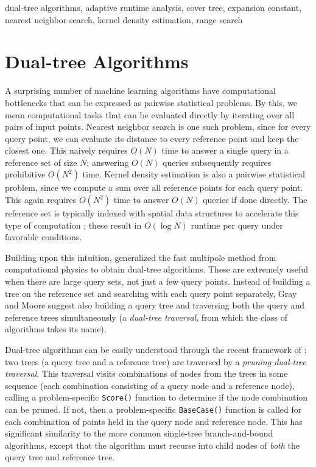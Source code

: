 \documentclass[twoside,11pt]{article} %
\begin{document}
\begin{keywords}
dual-tree algorithms, adaptive runtime analysis, cover tree, expansion constant,
nearest neighbor search, kernel density estimation, range search
\end{keywords}

\section{Dual-tree Algorithms}

A surprising number of machine learning algorithms have computational
bottlenecks that can be expressed as pairwise statistical problems.
By this, we mean computational tasks that can be evaluated directly by iterating over all
pairs of input points.
Nearest neighbor search is one such problem, since for every query point, we can
evaluate its distance to every reference point and keep the closest one.
This naively requires $O(N)$ time
to answer a single query in a reference set of size $N$; answering $O(N)$
queries subsequently requires prohibitive $O(N^2)$ time. Kernel density
estimation is also a pairwise statistical problem, since we compute a sum over all
reference points for each query point.
This again requires $O(N^2)$
time to answer $O(N)$ queries if done directly.
The reference set is typically indexed with
spatial data structures to accelerate this type of computation
\citep{finkel1974quad, langford2006}; these result in $O(\log N)$ runtime per
query under favorable conditions.

Building upon this intuition, \citet{nbody} generalized the fast multipole
method from computational physics to obtain dual-tree algorithms.  These are
extremely useful when there are large query sets, not just a few query points.
Instead of building a tree on the reference set and searching with each query
point separately, Gray and Moore suggest also building a query tree and
traversing both the query and reference trees simultaneously (a {\it dual-tree
traversal}, from which the class of algorithms takes its name).

Dual-tree algorithms can be easily understood through the recent framework of
\citet{curtin2013tree}: two trees (a query tree and a reference
tree) are traversed by a {\it pruning dual-tree traversal}.  This traversal
visits combinations of nodes from the trees in some sequence (each combination
consisting of a query node and a reference node), calling a problem-specific
\texttt{Score()} function to determine if the node combination can be pruned.
If not, then a problem-specific \texttt{BaseCase()} function is called for each
combination of points held in the query node and reference node.  This has
significant similarity to the more common single-tree branch-and-bound
algorithms, except that the algorithm must recurse into child nodes of {\it
both} the query tree and reference tree.
\end{document}
